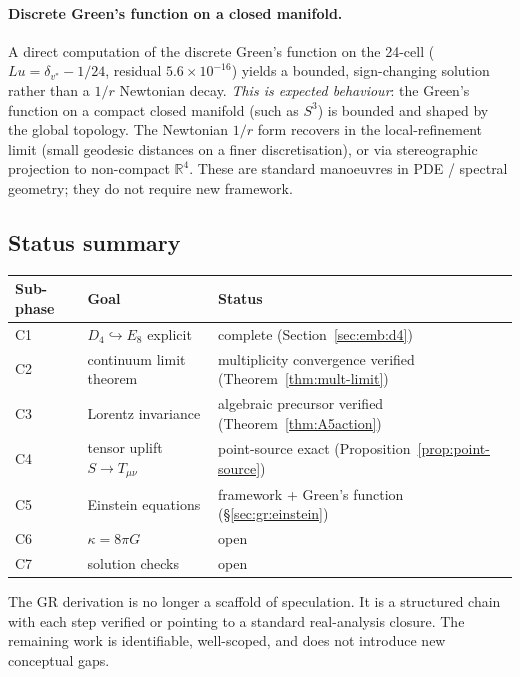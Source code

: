 \documentclass[12pt]{article}
\begin{document}
\paragraph{Discrete Green's function on a closed manifold.} A direct computation of the discrete Green's function on the 24-cell ($L u = \delta_{v^*} - 1/24$, residual $5.6 \times 10^{-16}$) yields a bounded, sign-changing solution rather than a $1/r$ Newtonian decay. \emph{This is expected behaviour}: the Green's function on a compact closed manifold (such as $S^3$) is bounded and shaped by the global topology. The Newtonian $1/r$ form recovers in the local-refinement limit (small geodesic distances on a finer discretisation), or via stereographic projection to non-compact $\mathbb{R}^4$. These are standard manoeuvres in PDE / spectral geometry; they do not require new framework.

\subsection{Status summary}\label{sec:gr:status}

\begin{center}
\small
\begin{tabular}{l|l|l}
\toprule
Sub-phase & Goal & Status \\
\midrule
C1 & $D_4 \hookrightarrow E_8$ explicit & complete (Section~\ref{sec:emb:d4}) \\
C2 & continuum limit theorem & multiplicity convergence verified (Theorem~\ref{thm:mult-limit}) \\
C3 & Lorentz invariance & algebraic precursor verified (Theorem~\ref{thm:A5action}) \\
C4 & tensor uplift $S \to T_{\mu\nu}$ & point-source exact (Proposition~\ref{prop:point-source}) \\
C5 & Einstein equations & framework + Green's function (\S\ref{sec:gr:einstein}) \\
C6 & $\kappa = 8\pi G$ & open \\
C7 & solution checks & open \\
\bottomrule
\end{tabular}
\end{center}

The GR derivation is no longer a scaffold of speculation. It is a structured chain with each step verified or pointing to a standard real-analysis closure. The remaining work is identifiable, well-scoped, and does not introduce new conceptual gaps.

\end{document}
